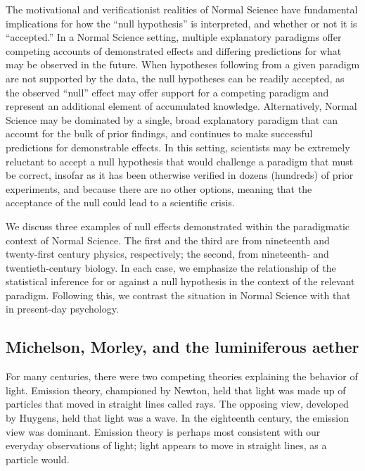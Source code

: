 \documentclass[english,floatsintext,man]{apa6}
\theoremstyle{definition}
\theoremstyle{definition}
\theoremstyle{definition}
\theoremstyle{remark}
\begin{document}
The motivational and verificationist realities of Normal Science have
fundamental implications for how the \enquote{null hypothesis} is
interpreted, and whether or not it is \enquote{accepted.} In a Normal
Science setting, multiple explanatory paradigms offer competing accounts
of demonstrated effects and differing predictions for what may be
observed in the future. When hypotheses following from a given paradigm
are not supported by the data, the null hypotheses can be readily
accepted, as the observed \enquote{null} effect may offer support for a
competing paradigm and represent an additional element of accumulated
knowledge. Alternatively, Normal Science may be dominated by a single,
broad explanatory paradigm that can account for the bulk of prior
findings, and continues to make successful predictions for demonstrable
effects. In this setting, scientists may be extremely reluctant to
accept a null hypothesis that would challenge a paradigm that must be
correct, insofar as it has been otherwise verified in dozens (hundreds)
of prior experiments, and because there are no other options, meaning
that the acceptance of the null could lead to a scientific crisis.

We discuss three examples of null effects demonstrated within the
paradigmatic context of Normal Science. The first and the third are from
nineteenth and twenty-first century physics, respectively; the second,
from nineteenth- and twentieth-century biology. In each case, we
emphasize the relationship of the statistical inference for or against a
null hypothesis in the context of the relevant paradigm. Following this,
we contrast the situation in Normal Science with that in present-day
psychology.

\hypertarget{michelson-morley-and-the-luminiferous-aether}{%
\subsection{Michelson, Morley, and the luminiferous
aether}\label{michelson-morley-and-the-luminiferous-aether}}

For many centuries, there were two competing theories explaining the
behavior of light. Emission theory, championed by Newton, held that
light was made up of particles that moved in straight lines called rays.
The opposing view, developed by Huygens, held that light was a wave. In
the eighteenth century, the emission view was dominant. Emission theory
is perhaps most consistent with our everyday observations of light;
light appears to move in straight lines, as a particle would.
\end{document}
